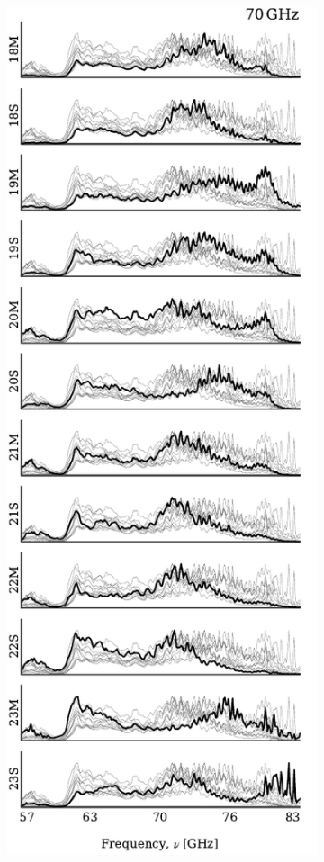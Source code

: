 \documentclass[twocolumn]{aa}
\newcommand{\?}[1]{\textcolor{red}{{\bf [#1]}}}
\begin{document}
\begin{figure}[p]
\begin{subfigure}{0.45\linewidth}
  \end{subfigure}
  \begin{subfigure}{0.45\linewidth}
    \includegraphics[width=\linewidth]{figs/NEWbps_70GHz.pdf}

\end{subfigure}
\end{figure}
\end{document}
